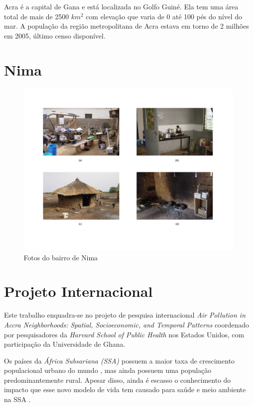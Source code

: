 Acra é a capital  de Gana e está localizada no Golfo Guiné. Ela tem uma área 
total de mais de 2500 $km^2$ com elevação que varia de 0 até 100 pés do nível 
do mar. 
A população da região metropolitana de Acra estava em torno de 2 milhões em 2005, 
último censo disponível.

\section{Nima}

\begin{figure}[H]
  \caption{Fotos do bairro de Nima}
  \includegraphics[scale=0.35]{../inputs/images/zheng/nima.pdf}
\end{figure}

\section{Projeto Internacional}

Este trabalho enquadra-se no projeto de pesquisa internacional 
\textit{Air Pollution in Accra Neighborhoods: Spatial, Socioeconomic, and Temporal Patterns} 
coordenado por pesquisadores da \textit{Harvard School of Public Health} nos Estados Unidos, 
com participação da Universidade de Ghana. 

Os países da \textit{África Subsariana (SSA)} possuem a maior taxa de crescimento 
populacional urbano do mundo \cite{united2006world}, mas ainda possuem uma população 
predominantemente rural. 
Apesar disso, ainda é escasso o conhecimento do impacto que esse novo modelo de vida 
tem causado para saúde e meio ambiente na SSA \cite{cohen2004urban}. 

